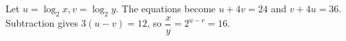 Let $u=\log_2x,v=\log_2y$. The equations become $u+4v=24$ and $v+4u=36$. Subtraction gives $3(u-v)=12$, so $\dfrac{x}{y}=2^{u-v}=\boxed{16}$.
